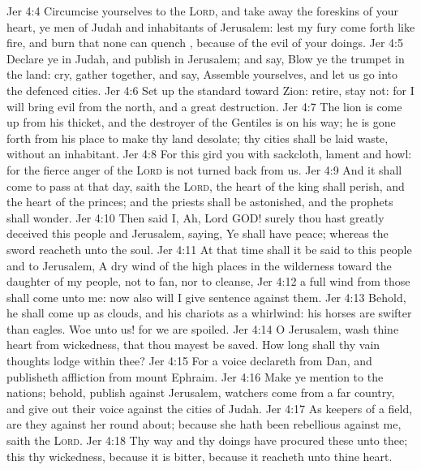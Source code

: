 \vs Jer 4:4 Circumcise yourselves to the \textsc{Lord}, and take away the foreskins of your heart, ye men of Judah and inhabitants of Jerusalem: lest my fury come forth like fire, and burn that none can quench , because of the evil of your doings.
\vs Jer 4:5 Declare ye in Judah, and publish in Jerusalem; and say, Blow ye the trumpet in the land: cry, gather together, and say, Assemble yourselves, and let us go into the defenced cities.
\vs Jer 4:6 Set up the standard toward Zion: retire, stay not: for I will bring evil from the north, and a great destruction.
\vs Jer 4:7 The lion is come up from his thicket, and the destroyer of the Gentiles is on his way; he is gone forth from his place to make thy land desolate;  thy cities shall be laid waste, without an inhabitant.
\vs Jer 4:8 For this gird you with sackcloth, lament and howl: for the fierce anger of the \textsc{Lord} is not turned back from us.
\vs Jer 4:9 And it shall come to pass at that day, saith the \textsc{Lord},  the heart of the king shall perish, and the heart of the princes; and the priests shall be astonished, and the prophets shall wonder.
\vs Jer 4:10 Then said I, Ah, Lord GOD! surely thou hast greatly deceived this people and Jerusalem, saying, Ye shall have peace; whereas the sword reacheth unto the soul.
\vs Jer 4:11 At that time shall it be said to this people and to Jerusalem, A dry wind of the high places in the wilderness toward the daughter of my people, not to fan, nor to cleanse,
\vs Jer 4:12  a full wind from those  shall come unto me: now also will I give sentence against them.
\vs Jer 4:13 Behold, he shall come up as clouds, and his chariots  as a whirlwind: his horses are swifter than eagles. Woe unto us! for we are spoiled.
\vs Jer 4:14 O Jerusalem, wash thine heart from wickedness, that thou mayest be saved. How long shall thy vain thoughts lodge within thee?
\vs Jer 4:15 For a voice declareth from Dan, and publisheth affliction from mount Ephraim.
\vs Jer 4:16 Make ye mention to the nations; behold, publish against Jerusalem,  watchers come from a far country, and give out their voice against the cities of Judah.
\vs Jer 4:17 As keepers of a field, are they against her round about; because she hath been rebellious against me, saith the \textsc{Lord}.
\vs Jer 4:18 Thy way and thy doings have procured these  unto thee; this  thy wickedness, because it is bitter, because it reacheth unto thine heart.

